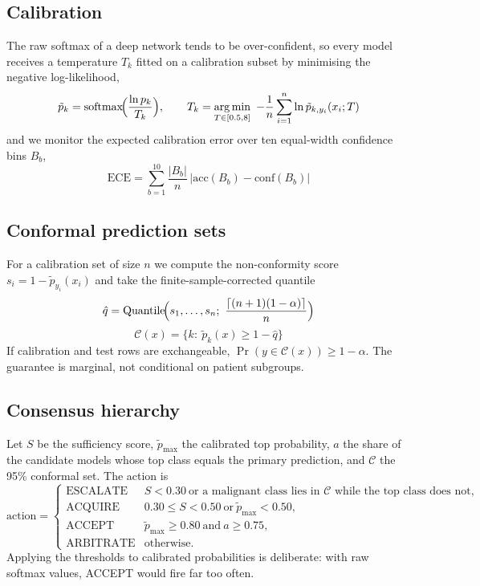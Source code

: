 \documentclass[conference]{IEEEtran}
\DeclareMathOperator*{\argmin}{arg\,min}
\DeclareMathOperator{\softmax}{softmax}
\begin{document}
\subsection{Calibration}
The raw softmax of a deep network tends to be over-confident, so every model receives a temperature $T_k$ fitted on a calibration subset by minimising the negative log-likelihood,
\begin{equation}
\tilde p_k=\softmax\!\Bigl(\frac{\ln p_k}{T_k}\Bigr),\qquad
T_k=\argmin_{T\in[0.5,8]}\ -\frac1n\sum_{i=1}^{n}\ln\tilde p_{k,y_i}(x_i;T)
\label{eq:T}
\end{equation}
and we monitor the expected calibration error over ten equal-width confidence bins $B_b$,
\begin{equation}
\mathrm{ECE}=\sum_{b=1}^{10}\frac{|B_b|}{n}\,\bigl|\mathrm{acc}(B_b)-\mathrm{conf}(B_b)\bigr|
\label{eq:ece}
\end{equation}

\subsection{Conformal prediction sets}
For a calibration set of size $n$ we compute the non-conformity score $s_i=1-\tilde p_{y_i}(x_i)$ and take the finite-sample-corrected quantile \cite{vovk2005,angelopoulos2021}
\begin{equation}
\hat q=\mathrm{Quantile}\!\Bigl(s_1,\dots,s_n;\ \frac{\lceil (n+1)(1-\alpha)\rceil}{n}\Bigr)
\label{eq:q}
\end{equation}
\begin{equation}
\mathcal C(x)=\bigl\{k:\ \tilde p_k(x)\ge 1-\hat q\bigr\}
\label{eq:set}
\end{equation}
If calibration and test rows are exchangeable, $\Pr(y\in\mathcal C(x))\ge 1-\alpha$. The guarantee is marginal, not conditional on patient subgroups.

\subsection{Consensus hierarchy}
Let $S$ be the sufficiency score, $\tilde p_{\max}$ the calibrated top probability, $a$ the share of the candidate models whose top class equals the primary prediction, and $\mathcal C$ the 95\% conformal set. The action is
\begin{equation}
\mathrm{action}=
\begin{cases}
\text{ESCALATE} & S<0.30\ \text{or a malignant class lies in }\mathcal C\text{ while the top class does not},\\
\text{ACQUIRE} & 0.30\le S<0.50\ \text{or}\ \tilde p_{\max}<0.50,\\
\text{ACCEPT} & \tilde p_{\max}\ge 0.80\ \text{and}\ a\ge 0.75,\\
\text{ARBITRATE} & \text{otherwise.}
\end{cases}
\label{eq:act}
\end{equation}
Applying the thresholds to calibrated probabilities is deliberate: with raw softmax values, ACCEPT would fire far too often.
\end{document}
